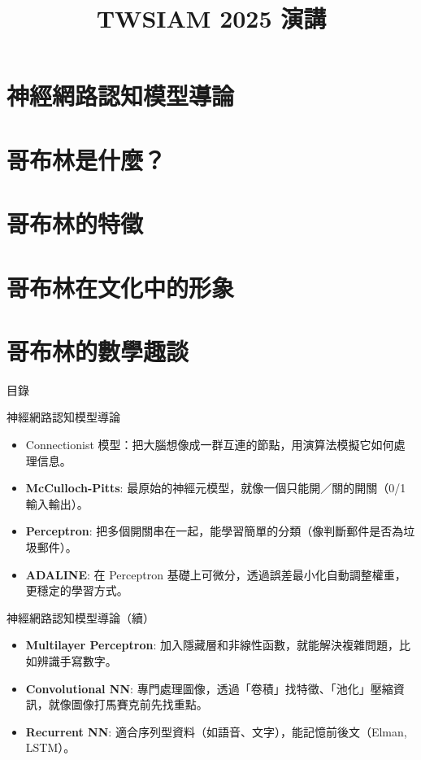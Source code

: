 \documentclass{beamer}
\title{TWSIAM 2025 演講}
\author{}
\date{}
\begin{document}
\frame{\titlepage}

\section{神經網路認知模型導論}
\section{哥布林是什麼？}
\section{哥布林的特徵}
\section{哥布林在文化中的形象}
\section{哥布林的數學趣談}

\begin{frame}{目錄}
  \tableofcontents
\end{frame}

\begin{frame}{神經網路認知模型導論}
  \begin{itemize}
    \item Connectionist 模型：把大腦想像成一群互連的節點，用演算法模擬它如何處理信息。
    \item \textbf{McCulloch-Pitts}: 最原始的神經元模型，就像一個只能開／關的開關（0/1 輸入輸出）。
    \item \textbf{Perceptron}: 把多個開關串在一起，能學習簡單的分類（像判斷郵件是否為垃圾郵件）。
    \item \textbf{ADALINE}: 在 Perceptron 基礎上可微分，透過誤差最小化自動調整權重，更穩定的學習方式。
  \end{itemize}
\end{frame}

\begin{frame}{神經網路認知模型導論（續）}
  \begin{itemize}
    \item \textbf{Multilayer Perceptron}: 加入隱藏層和非線性函數，就能解決複雜問題，比如辨識手寫數字。
    \item \textbf{Convolutional NN}: 專門處理圖像，透過「卷積」找特徵、「池化」壓縮資訊，就像圖像打馬賽克前先找重點。
    \item \textbf{Recurrent NN}: 適合序列型資料（如語音、文字），能記憶前後文（Elman, LSTM）。
  \end{itemize}
\end{frame}
\end{document}
